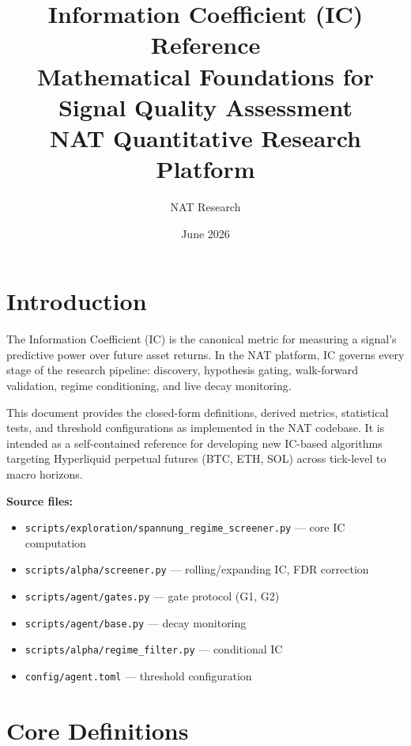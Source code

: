 \documentclass[11pt,a4paper]{article}
\title{\textbf{Information Coefficient (IC) Reference}\\[0.5em]
\large Mathematical Foundations for Signal Quality Assessment\\[0.3em]
\normalsize NAT Quantitative Research Platform}
\author{NAT Research}
\date{June 2026}
\begin{document}
\maketitle
\tableofcontents
\newpage

\section{Introduction}

The Information Coefficient (IC) is the canonical metric for measuring a signal's
predictive power over future asset returns. In the NAT platform, IC governs every
stage of the research pipeline: discovery, hypothesis gating, walk-forward
validation, regime conditioning, and live decay monitoring.

This document provides the closed-form definitions, derived metrics, statistical
tests, and threshold configurations as implemented in the NAT codebase. It is
intended as a self-contained reference for developing new IC-based algorithms
targeting Hyperliquid perpetual futures (BTC, ETH, SOL) across tick-level to
macro horizons.

\medskip
\textbf{Source files:}
\begin{itemize}    \item \texttt{scripts/exploration/spannung\_regime\_screener.py} --- core IC computation
    \item \texttt{scripts/alpha/screener.py} --- rolling/expanding IC, FDR correction
    \item \texttt{scripts/agent/gates.py} --- gate protocol (G1, G2)
    \item \texttt{scripts/agent/base.py} --- decay monitoring
    \item \texttt{scripts/alpha/regime\_filter.py} --- conditional IC
    \item \texttt{config/agent.toml} --- threshold configuration
\end{itemize}

\section{Core Definitions}

\end{document}
